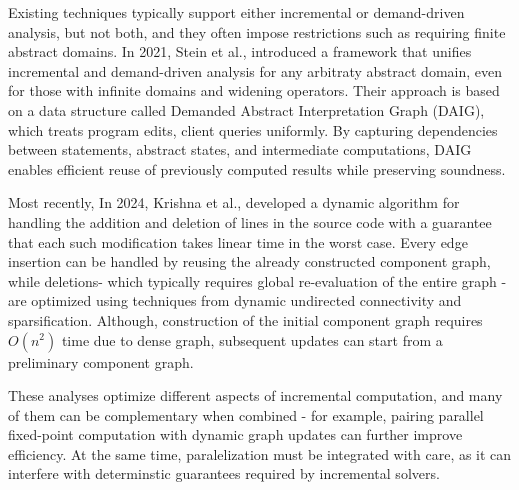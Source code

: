 Existing techniques typically support either incremental or demand-driven analysis, but not both, and they often impose restrictions such as requiring finite abstract domains.
In 2021, Stein et al., \cite{stein2022demanded} introduced a framework that unifies incremental and demand-driven analysis for any arbitraty abstract domain, even for those with infinite domains and widening operators.
Their approach is based on a data structure called Demanded Abstract Interpretation Graph (DAIG), which treats program edits, client queries uniformly.
By capturing dependencies between statements, abstract states, and intermediate computations, DAIG enables efficient reuse of previously computed results while preserving soundness.


Most recently, In 2024, Krishna et al., \cite{krishna2024fly} developed a dynamic algorithm for handling the addition and deletion of lines in the source code with a guarantee that each such modification takes
linear time in the worst case. Every edge insertion can be handled by reusing the already constructed component graph, 
while deletions- which typically requires global re-evaluation of the entire graph - are optimized using techniques from dynamic undirected connectivity and sparsification.
Although, construction of the initial component graph requires $O(n^2)$ time due to dense graph, subsequent updates can start from a preliminary component graph.

These analyses optimize different aspects of incremental computation, and many of them can be complementary when combined - for example, 
pairing parallel fixed-point computation with dynamic graph updates can further improve efficiency. At the same time, paralelization must be integrated with care, as it can interfere with determinstic guarantees required by incremental solvers.







